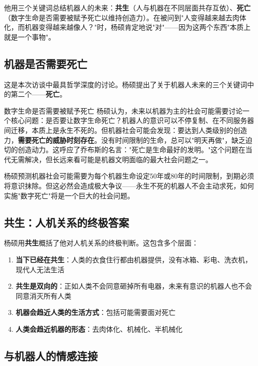 他用三个关键词总结机器人的未来：\textbf{共生}（人与机器在不同层面共存互依）、\textbf{死亡}（数字生命是否需要被赋予死亡以维持创造力）。在被问到"人变得越来越去肉体化，而机器变得越来越像人？"时，杨硕肯定地说"对"——因为这两个东西"本质上就是一个事物"。

\subsection{机器是否需要死亡}

这是本次访谈中最具哲学深度的讨论。杨硕提出了关于机器人未来的三个关键词中的第二个——\textbf{死亡}。

\begin{warningbox}{数字生命是否需要被赋予死亡}
杨硕认为，未来以机器为主的社会可能需要讨论一个核心问题：是否要让数字生命死亡？机器人的意识可以不停复制、在不同服务器间迁移，本质上是永生不死的。但机器社会可能会发现：要达到人类级别的创造力，\textbf{需要死亡的威胁时刻存在}。没有时间限制的生命，总可以"明天再做"，缺乏迫切的创造动力。这呼应了乔布斯的名言："死亡是生命最好的发明。"这个问题在当代无需解决，但长远来看可能是机器文明面临的最大社会问题之一。
\end{warningbox}

杨硕预测机器社会可能需要为每个机器生命设定50年或80年的时间限制，到期必须将意识抹除。但这必然会造成极大争议——永生不死的机器人不会主动求死，如何实施"数字死亡"将是一个巨大的社会问题。

\subsection{共生：人机关系的终极答案}

杨硕用\textbf{共生}概括了他对人机关系的终极判断。这包含多个层面：

\begin{enumerate}
    \item \textbf{当下已经在共生}：人类的衣食住行都由机器提供，没有冰箱、彩电、洗衣机，现代人无法生活
    \item \textbf{共生是双向的}：正如人类不会同意砸掉所有电器，未来有意识的机器人也不会同意消灭所有人类
    \item \textbf{机器会趋近人类的生活方式}：包括可能需要面对死亡
    \item \textbf{人类会趋近机器的形态}：去肉体化、机械化、半机械化
\end{enumerate}

\subsection{与机器人的情感连接}


